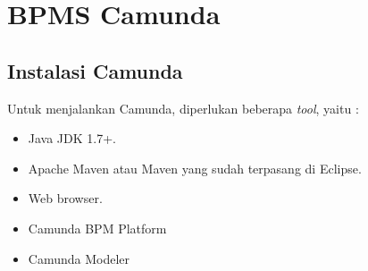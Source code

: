 \section{BPMS Camunda}
\subsection{Instalasi Camunda}
\label{instalasicamunda}
Untuk menjalankan Camunda, diperlukan beberapa \textit{tool}\cite{bpmngetstarted:15:camunda}, yaitu :
\begin{itemize}
	\item Java JDK 1.7+.
	\item Apache Maven atau Maven yang sudah terpasang di Eclipse.
	\item Web browser.
	\item Camunda BPM Platform 
	\item Camunda Modeler
\end{itemize}


